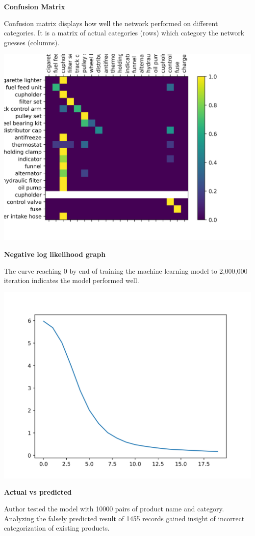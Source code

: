 \documentclass{article}
\renewcommand{\subsection}[1]{
        {\textbf{#1}}

}
\newenvironment{Figure}
  {\par\medskip\noindent\minipage{\linewidth}}
  {\endminipage\par\medskip}
\begin{document}
\begin{multicols*}{3}
\begin{center}
    \end{center}
\columnbreak
    \subsection{Confusion Matrix}
    Confusion matrix displays how well the network performed on different categories. It is a matrix of actual categories (rows) which category the network guesses (columns).

    \begin{Figure}
        \centering
        \includegraphics[width=0.50\linewidth]{confusion._200epoch}
        \captionsetup{font=footnotesize}
      
        \label{fig:cm}
    \end{Figure}


    \subsection{Negative log likelihood graph}
    The curve reaching 0 by end of training the machine learning model to 2,000,000 iteration indicates the model performed well.

    \begin{Figure}
        \centering
        \includegraphics[width=0.50\linewidth]{loss}
        \captionsetup{font=footnotesize}
        
        \label{fig:loss}
    \end{Figure}

    \subsection{Actual vs predicted }
    Author tested the model with 10000 pairs of product name and category.
    Analyzing the falsely predicted result of 1455 records gained insight of incorrect categorization of existing products.
\vspace{0.5cm}


\end{multicols*}
\end{document}
